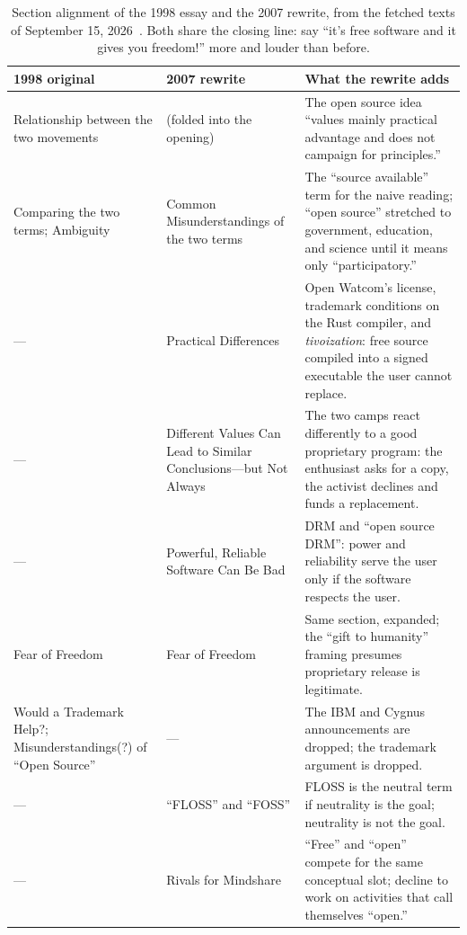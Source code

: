 \documentclass[10pt,letterpaper,twocolumn]{article}
\newcommand{\term}[1]{``#1''}
\begin{document}
\begin{table}[t]
\small
\centering
\begin{tabularx}{\textwidth}{@{}Y Y Y@{}}
\toprule
\textbf{1998 original} & \textbf{2007 rewrite} & \textbf{What the rewrite adds} \\
\midrule
Relationship between the two movements & (folded into the opening) & The open source idea \term{values mainly practical advantage and does not campaign for principles.} \\
Comparing the two terms; Ambiguity & Common Misunderstandings of the two terms & The \term{source available} term for the naive reading; \term{open source} stretched to government, education, and science until it means only \term{participatory.} \\
--- & Practical Differences & Open Watcom's license, trademark conditions on the Rust compiler, and \emph{tivoization}: free source compiled into a signed executable the user cannot replace. \\
--- & Different Values Can Lead to Similar Conclusions---but Not Always & The two camps react differently to a good proprietary program: the enthusiast asks for a copy, the activist declines and funds a replacement. \\
--- & Powerful, Reliable Software Can Be Bad & DRM and \term{open source DRM}: power and reliability serve the user only if the software respects the user. \\
Fear of Freedom & Fear of Freedom & Same section, expanded; the \term{gift to humanity} framing presumes proprietary release is legitimate. \\
Would a Trademark Help?; Misunderstandings(?) of \term{Open Source} & --- & The IBM and Cygnus announcements are dropped; the trademark argument is dropped. \\
--- & \term{FLOSS} and \term{FOSS} & FLOSS is the neutral term if neutrality is the goal; neutrality is not the goal. \\
--- & Rivals for Mindshare & \term{Free} and \term{open} compete for the same conceptual slot; decline to work on activities that call themselves \term{open.} \\
\bottomrule
\end{tabularx}
\caption{Section alignment of the 1998 essay and the 2007 rewrite, from the fetched texts of September 15, 2026~\citep{stallman1998better,stallman2007misses}. Both share the closing line: say \term{it's free software and it gives you freedom!} more and louder than before.}
\label{tab:essays}
\end{table}
\end{document}
